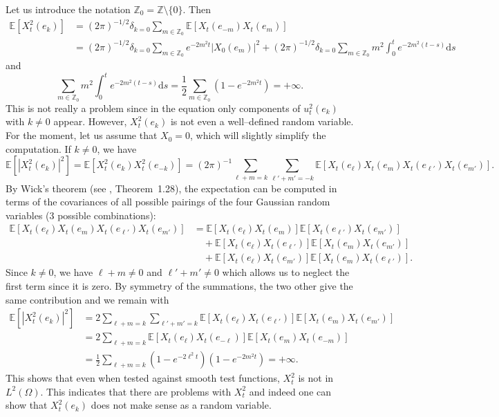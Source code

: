 \documentclass[a4paper,11pt]{article}
\newcommand{\mathd}{\mathrm{d}}
\begin{document}
Let us introduce the notation $\mathbb{Z}_0 =\mathbb{Z} \setminus \{ 0 \}$.
Then
\begin{align*}
   \mathbb{E} [X_t^2 (e_k)] & = (2 \pi)^{- 1 / 2} \delta_{k = 0} \sum_{m \in \mathbb{Z}_0} \mathbb{E} [X_t (e_{- m}) X_t (e_m)] \\
   & = (2 \pi)^{- 1 / 2} \delta_{k = 0} \sum_{m \in \mathbb{Z}_0} e^{- 2 m^2 t} | X_0 (e_m) |^2 + (2 \pi)^{- 1 / 2} \delta_{k = 0} \sum_{m \in \mathbb{Z}_0} m^2 \int_0^t e^{- 2 m^2 (t - s)} \mathd s
\end{align*}
and
\[ \sum_{m \in \mathbb{Z}_0} m^2 \int_0^t e^{- 2 m^2 (t - s)} \mathd s =
   \frac{1}{2} \sum_{m \in \mathbb{Z}_0} (1 - e^{- 2 m^2 t}) = + \infty . \]
This is not really a problem since in the equation only components of $u^2_t
(e_k)$ with $k \neq 0$ appear. However, $X^2_t (e_k)$ is not even a
well--defined random variable. For the moment, let us assume that $X_0 = 0$,
which will slightly simplify the computation. If $k \neq 0$, we have
\[ \mathbb{E} [| X^2_t (e_k) |^2] =\mathbb{E} [X^2_t (e_k) X^2_t (e_{- k})]
   = (2 \pi)^{- 1} \sum_{\ell + m = k} \sum_{\ell' + m' = - k} \mathbb{E}
   [X_t (e_{\ell}) X_t (e_m) X_t (e_{\ell'}) X_t (e_{m'})] . \]
By Wick's theorem (see {\cite{Janson1997}}, Theorem~1.28), the expectation can
be computed in terms of the covariances of all possible pairings of the four
Gaussian random variables (3 possible combinations):
\begin{align*}
   \mathbb{E} [X_t (e_{\ell}) X_t (e_m) X_t (e_{\ell'}) X_t (e_{m'})] &=\mathbb{E} [X_t (e_{\ell}) X_t (e_m)] \mathbb{E} [X_t (e_{\ell'}) X_t(e_{m'})] \\
   &\quad + \mathbb{E} [X_t (e_{\ell}) X_t (e_{\ell'})] \mathbb{E} [X_t (e_m) X_t(e_{m'})] \\
   &\quad +\mathbb{E} [X_t (e_{\ell}) X_t (e_{m'})] \mathbb{E} [X_t (e_m) X_t (e_{\ell'})].
\end{align*}
Since $k \neq 0$, we have $\ell + m \neq 0$ and $\ell' + m' \neq 0$ which
allows us to neglect the first term since it is zero. By symmetry of the
summations, the two other give the same contribution and we remain with
\begin{align}\label{eq:OU square variance}
    \mathbb{E} [| X^2_t (e_k) |^2] & = 2 \sum_{\ell + m = k} \sum_{\ell' + m' = k} \mathbb{E} [X_t (e_{\ell}) X_t (e_{\ell'})] \mathbb{E} [X_t (e_m) X_t (e_{m'})] \\ \nonumber
    & = 2 \sum_{\ell + m = k} \mathbb{E} [X_t (e_{\ell}) X_t (e_{- \ell})] \mathbb{E} [X_t (e_m) X_t (e_{- m})] \\ \nonumber
    & = \frac{1}{2} \sum_{\ell + m = k} (1 - e^{- 2 \ell^2 t}) (1 - e^{- 2 m^2 t}) = + \infty.
\end{align}
This shows that even when tested against smooth test functions, $X_t^2$ is not
in $L^2 (\Omega)$. This indicates that there are problems with $X_t^2$ and
indeed one can show that $X_t^2 (e_k)$ does not make sense as a random
variable.
\end{document}

